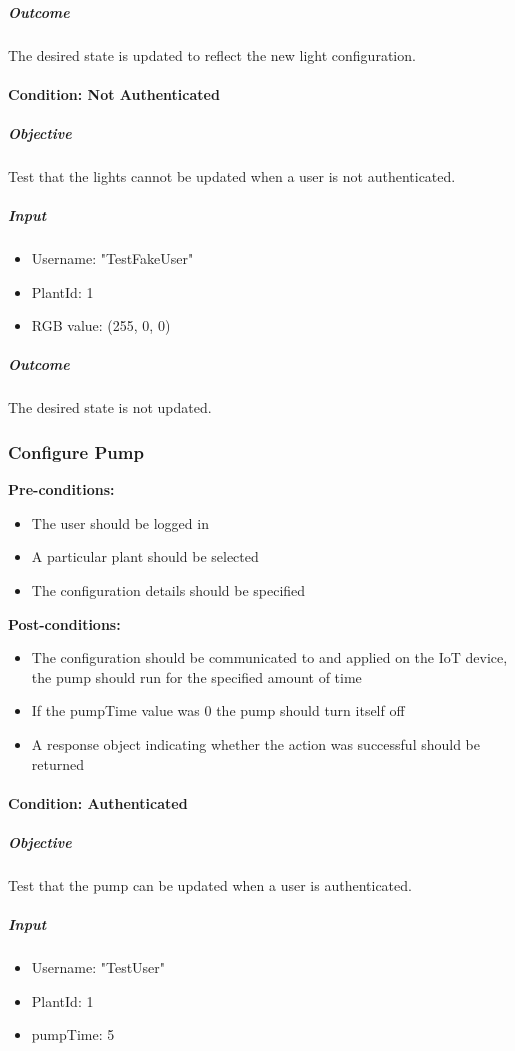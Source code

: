 \documentclass{article}
\begin{document}
	\subparagraph{Outcome}
	The desired state is updated to reflect the new light configuration.
	
	\paragraph{Condition: Not Authenticated}
	\subparagraph{Objective}
	Test that the lights cannot be updated when a user is not authenticated.
	\subparagraph{Input}
	\begin{itemize}
		\item Username: "TestFakeUser"
		\item PlantId: 1
		\item RGB value: (255, 0, 0)
	\end{itemize}
	
	\subparagraph{Outcome}
	The desired state is not updated.
	
	\subsubsection{Configure Pump}
	\textbf{Pre-conditions:}
	\begin{itemize}
		\item The user should be logged in
		\item A particular plant should be selected
		\item The configuration details should be specified
	\end{itemize}
	\textbf{Post-conditions:}
	\begin{itemize}
		\item The configuration should be communicated to and applied on the IoT device, the pump should run for the specified amount of time
		\item If the pumpTime value was 0 the pump should turn itself off
		\item A response object indicating whether the action was successful should be returned
	\end{itemize}
	
	\paragraph{Condition: Authenticated}
	\subparagraph{Objective}
	Test that the pump can be updated when a user is authenticated.
	\subparagraph{Input}
	\begin{itemize}
		\item Username: "TestUser"
		\item PlantId: 1
		\item pumpTime: 5
	\end{itemize}
	
\end{document}
